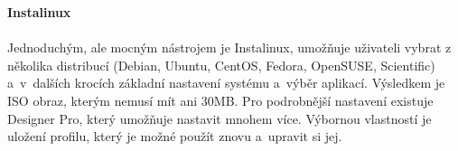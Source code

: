 \documentclass[a4paper,12pt]{article}
\newcommand{\nadpis}[1]{%
	\vspace{4 mm}
	\textbf{#1}\\
	\vspace{4 mm}
	}
\begin{document}
\nadpis{Instalinux}\\ \label{sec:Instalinux}
Jednoduchým, ale mocným nástrojem je Instalinux, umožňuje uživateli vybrat z několika distribucí (Debian, Ubuntu, CentOS, Fedora, OpenSUSE, Scientific) a~v~dalších krocích základní nastavení systému a~výběr aplikací. Výsledkem je ISO obraz, kterým nemusí mít ani 30MB. Pro podrobnější nastavení existuje Designer Pro, který umožňuje nastavit mnohem více. Výbornou vlastností je uložení profilu, který je možné použít znovu a~upravit si jej.\\

\end{document}
